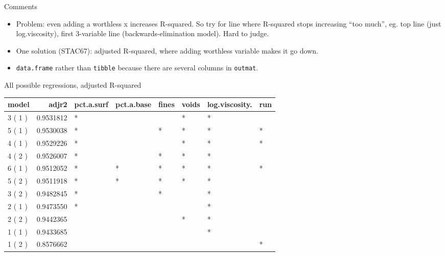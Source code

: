 \begin{frame}[fragile]{Comments}
\protect\hypertarget{comments-3}{}
\begin{itemize}
\tightlist
\item
  Problem: even adding a worthless x increases R-squared. So try for
  line where R-squared stops increasing ``too much'', eg. top line (just
  log.viscosity), first 3-variable line (backwards-elimination model).
  Hard to judge.
\item
  One solution (STAC67): adjusted R-squared, where adding worthless
  variable makes it go down.
\item
  \texttt{data.frame} rather than \texttt{tibble} because there are
  several columns in \texttt{outmat}.
\end{itemize}
\end{frame}

\begin{frame}[fragile]{All possible regressions, adjusted R-squared}
\protect\hypertarget{all-possible-regressions-adjusted-r-squared}{}
\scriptsize

\begin{Shaded}
\begin{Highlighting}[]
\OperatorTok{\%\textgreater{}\%}\StringTok{ }
\StringTok{  }\NormalTok{(}\NormalTok{) }\OperatorTok{\%\textgreater{}\%}\StringTok{ }
\StringTok{  }\NormalTok{(}
\end{Highlighting}
\end{Shaded}

\begin{longtable}[]{@{}lrllllll@{}}
\toprule
model & adjr2 & pct.a.surf & pct.a.base & fines & voids & log.viscosity.
& run\tabularnewline
\midrule
\endhead
3 ( 1 ) & 0.9531812 & * & & & * & * &\tabularnewline
5 ( 1 ) & 0.9530038 & * & & * & * & * & *\tabularnewline
4 ( 1 ) & 0.9529226 & * & & & * & * & *\tabularnewline
4 ( 2 ) & 0.9526007 & * & & * & * & * &\tabularnewline
6 ( 1 ) & 0.9512052 & * & * & * & * & * & *\tabularnewline
5 ( 2 ) & 0.9511918 & * & * & * & * & * &\tabularnewline
3 ( 2 ) & 0.9482845 & * & & * & & * &\tabularnewline
2 ( 1 ) & 0.9473550 & * & & & & * &\tabularnewline
2 ( 2 ) & 0.9442365 & & & & * & * &\tabularnewline
1 ( 1 ) & 0.9433685 & & & & & * &\tabularnewline
1 ( 2 ) & 0.8576662 & & & & & & *\tabularnewline
\bottomrule
\end{longtable}

\normalsize
\end{frame}

